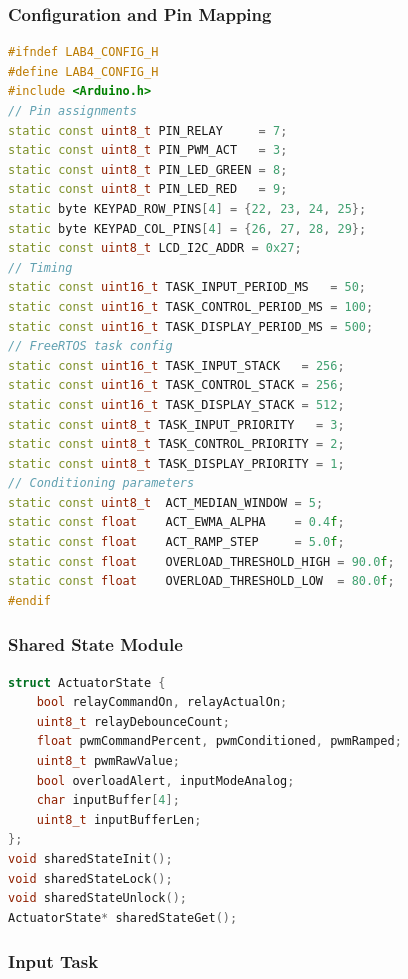 \subsubsection{Configuration and Pin Mapping}

\begin{lstlisting}[language=C++, caption=lab4\_config.h --- Pin mapping and configuration, label=lst:lab4_config]
#ifndef LAB4_CONFIG_H
#define LAB4_CONFIG_H
#include <Arduino.h>
// Pin assignments
static const uint8_t PIN_RELAY     = 7;
static const uint8_t PIN_PWM_ACT   = 3;
static const uint8_t PIN_LED_GREEN = 8;
static const uint8_t PIN_LED_RED   = 9;
static byte KEYPAD_ROW_PINS[4] = {22, 23, 24, 25};
static byte KEYPAD_COL_PINS[4] = {26, 27, 28, 29};
static const uint8_t LCD_I2C_ADDR = 0x27;
// Timing
static const uint16_t TASK_INPUT_PERIOD_MS   = 50;
static const uint16_t TASK_CONTROL_PERIOD_MS = 100;
static const uint16_t TASK_DISPLAY_PERIOD_MS = 500;
// FreeRTOS task config
static const uint16_t TASK_INPUT_STACK   = 256;
static const uint16_t TASK_CONTROL_STACK = 256;
static const uint16_t TASK_DISPLAY_STACK = 512;
static const uint8_t TASK_INPUT_PRIORITY   = 3;
static const uint8_t TASK_CONTROL_PRIORITY = 2;
static const uint8_t TASK_DISPLAY_PRIORITY = 1;
// Conditioning parameters
static const uint8_t  ACT_MEDIAN_WINDOW = 5;
static const float    ACT_EWMA_ALPHA    = 0.4f;
static const float    ACT_RAMP_STEP     = 5.0f;
static const float    OVERLOAD_THRESHOLD_HIGH = 90.0f;
static const float    OVERLOAD_THRESHOLD_LOW  = 80.0f;
#endif
\end{lstlisting}

\subsubsection{Shared State Module}

\begin{lstlisting}[language=C++, caption=shared\_state.h --- Shared state interface, label=lst:shared_state_h_app]
struct ActuatorState {
    bool relayCommandOn, relayActualOn;
    uint8_t relayDebounceCount;
    float pwmCommandPercent, pwmConditioned, pwmRamped;
    uint8_t pwmRawValue;
    bool overloadAlert, inputModeAnalog;
    char inputBuffer[4];
    uint8_t inputBufferLen;
};
void sharedStateInit();
void sharedStateLock();
void sharedStateUnlock();
ActuatorState* sharedStateGet();
\end{lstlisting}

\subsubsection{Input Task}

